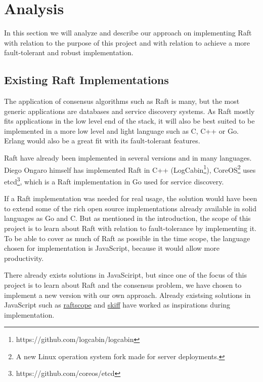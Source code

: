 \section{Analysis} %
\label{sec:analysis}

In this section we will analyze and describe our approach on implementing Raft with relation to the purpose of this project and with relation to achieve a more fault-tolerant and robust implementation.

\subsection{Existing Raft Implementations} %
\label{sub:existing_raft_implementations}

The application of consensus algorithms such as Raft is many, but the most generic applications are databases and service discovery systems. As Raft mostly fits applications in the low level end of the stack, it will also be best suited to be implemented in a more low level and light language such as C, C++ or Go. Erlang would also be a great fit with its fault-tolerant features.

Raft have already been implemented in several versions and in many languages. Diego Ongaro himself has implemented Raft in C++ (LogCabin\footnote{https://github.com/logcabin/logcabin}), CoreOS\footnote{A new Linux operation system fork made for server deployments.} uses etcd\footnote{https://github.com/coreos/etcd}, which is a Raft implementation in Go used for service discovery.

If a Raft implementation was needed for real usage, the solution would have been to extend some of the rich open source implementations already available in solid languages as Go and C. But as mentioned in the introduction, the scope of this project is to learn about Raft with relation to fault-tolerance by implementing it. To be able to cover as much of Raft as possible in the time scope, the language chosen for implementation is JavaScript, because it would allow more productivity.

There already exists solutions in JavaSciript, but since one of the focus of this project is to learn about Raft and the consensus problem, we have chosen to implement a new version with our own approach. Already existsing solutions in JavaScript such as \href{https://github.com/ongardie/raftscope}{raftscope} and \href{https://github.com/pgte/skiff-algorithm}{skiff} have worked as inspirations during implementation.

